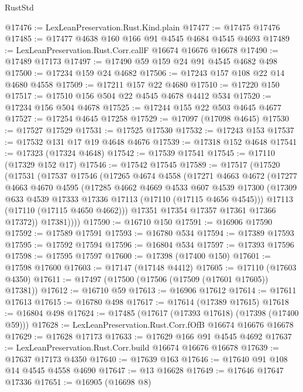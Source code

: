 \begin{lexlean}{RustStd}
\begin{coremodule}
@17476 := LexLeanPreservation.Rust.Kind.plain
@17477 := @17475 @17476
@17485 := @17477 @4638 @160 @166 @91 @4545 @4684 @4545 @4693
@17489 := LexLeanPreservation.Rust.Corr.callF @16674 @16676 @16678
@17490 := @17489 @17173
@17497 := @17490 @59 @159 @24 @91 @4545 @4682 @498
@17500 := @17234 @159 @24 @4682
@17506 := @17243 @157 @108 @22 @14 @4680 @4558
@17509 := @17211 @157 @22 @4680
@17510 := @17220 @150
@17517 := @17510 @156 @504 @22 @4545 @4678 @4412 @534
@17520 := @17234 @156 @504 @4678
@17525 := @17244 @155 @22 @503 @4645 @4677
@17527 := @17254 @4645 @17258
@17529 := @17097 (@17098 @4645)
@17530 := @17527 @17529
@17531 := @17525 @17530
@17532 := @17243 @153
@17537 := @17532 @131 @17 @19 @4648 @4676
@17539 := @17318 @152 @4648
@17541 := @17323 (@17324 @4648)
@17542 := @17539 @17541
@17545 := @17110 (@17329 @152 @17)
@17546 := @17542 @17545
@17589 := @17517
    (@17520
      (@17531
        (@17537
          @17546
          (@17265
            @4674
            @4558
            (@17271
              @4663
              @4672
              (@17277
                @4663
                @4670
                @4595
                (@17285
                  @4662
                  @4669
                  @4533
                  @607
                  @4539
                  @17300
                  (@17309 @633 @4539 @17333 @17336 @17113 (@17110 (@17115 @4656 @4545)))
                  @17113
                  (@17110 (@17115 @4650 @4662)))
                @17351
                @17354
                @17357
                @17361
                @17366
                @17372))
            @17381))))
@17590 := @16710 @150
@17591 := @16906 @17590
@17592 := @17589 @17591
@17593 := @16780 @534
@17594 := @17389 @17593
@17595 := @17592 @17594
@17596 := @16804 @534
@17597 := @17393 @17596
@17598 := @17595 @17597
@17600 := @17398 (@17400 @150)
@17601 := @17598 @17600
@17603 := @17147 (@17148 @4412)
@17605 := @17110 (@17603 @4350)
@17611 := @17497 (@17500 (@17506 (@17509 (@17601 @17605)) @17381))
@17612 := @16710 @59
@17613 := @16906 @17612
@17614 := @17611 @17613
@17615 := @16780 @498
@17617 := @17614 (@17389 @17615)
@17618 := @16804 @498
@17624 := @17485 (@17617 (@17393 @17618) (@17398 (@17400 @59)))
@17628 := LexLeanPreservation.Rust.Corr.fOfB @16674 @16676 @16678
@17629 := @17628 @17173
@17633 := @17629 @166 @91 @4545 @4692
@17637 := LexLeanPreservation.Rust.Corr.build @16674 @16676 @16678
@17639 := @17637 @17173 @4350
@17640 := @17639 @163
@17646 := @17640 @91 @108 @14 @4545 @4558 @4690
@17647 := @13 @16628
@17649 := @17646 @17647 @17336
@17651 := @16905 (@16698 @8)

\end{coremodule}
\end{lexlean}
